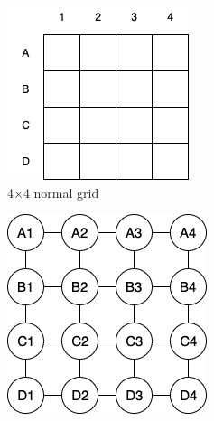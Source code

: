 \begin{figure}[h!]
  \centering
  \begin{subfigure}[b]{0.18\linewidth}
    \includegraphics[width=\linewidth]{images/4x4_grid.png}
     \caption{4$\times$4 normal grid\newline\newline}
  \end{subfigure}
  \hfill
  \begin{subfigure}[b]{0.18\linewidth}
    \includegraphics[width=\linewidth]{images/4_way_graph.png}

\end{subfigure}
\end{figure}
